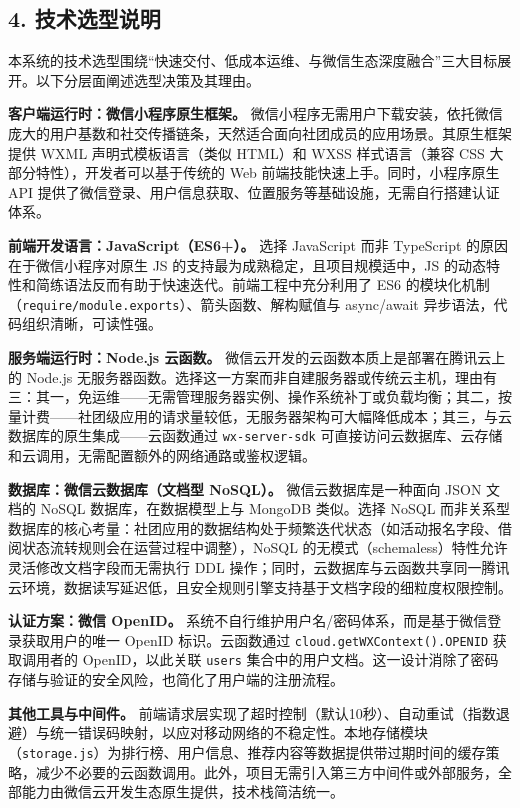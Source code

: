 \documentclass[a4paper,12pt]{article}
\begin{document}
\subsection{4. 技术选型说明}

本系统的技术选型围绕“快速交付、低成本运维、与微信生态深度融合”三大目标展开。以下分层面阐述选型决策及其理由。

\textbf{客户端运行时：微信小程序原生框架。} 微信小程序无需用户下载安装，依托微信庞大的用户基数和社交传播链条，天然适合面向社团成员的应用场景。其原生框架提供 WXML 声明式模板语言（类似 HTML）和 WXSS 样式语言（兼容 CSS 大部分特性），开发者可以基于传统的 Web 前端技能快速上手。同时，小程序原生 API 提供了微信登录、用户信息获取、位置服务等基础设施，无需自行搭建认证体系。

\textbf{前端开发语言：JavaScript（ES6+）。} 选择 JavaScript 而非 TypeScript 的原因在于微信小程序对原生 JS 的支持最为成熟稳定，且项目规模适中，JS 的动态特性和简练语法反而有助于快速迭代。前端工程中充分利用了 ES6 的模块化机制（\texttt{require/module.exports}）、箭头函数、解构赋值与 async/await 异步语法，代码组织清晰，可读性强。

\textbf{服务端运行时：Node.js 云函数。} 微信云开发的云函数本质上是部署在腾讯云上的 Node.js 无服务器函数。选择这一方案而非自建服务器或传统云主机，理由有三：其一，免运维——无需管理服务器实例、操作系统补丁或负载均衡；其二，按量计费——社团级应用的请求量较低，无服务器架构可大幅降低成本；其三，与云数据库的原生集成——云函数通过 \texttt{wx-server-sdk} 可直接访问云数据库、云存储和云调用，无需配置额外的网络通路或鉴权逻辑。

\textbf{数据库：微信云数据库（文档型 NoSQL）。} 微信云数据库是一种面向 JSON 文档的 NoSQL 数据库，在数据模型上与 MongoDB 类似。选择 NoSQL 而非关系型数据库的核心考量：社团应用的数据结构处于频繁迭代状态（如活动报名字段、借阅状态流转规则会在运营过程中调整），NoSQL 的无模式（schemaless）特性允许灵活修改文档字段而无需执行 DDL 操作；同时，云数据库与云函数共享同一腾讯云环境，数据读写延迟低，且安全规则引擎支持基于文档字段的细粒度权限控制。

\textbf{认证方案：微信 OpenID。} 系统不自行维护用户名/密码体系，而是基于微信登录获取用户的唯一 OpenID 标识。云函数通过 \texttt{cloud.\allowbreak getWXContext().\allowbreak OPENID} 获取调用者的 OpenID，以此关联 \texttt{users} 集合中的用户文档。这一设计消除了密码存储与验证的安全风险，也简化了用户端的注册流程。

\textbf{其他工具与中间件。} 前端请求层实现了超时控制（默认10秒）、自动重试（指数退避）与统一错误码映射，以应对移动网络的不稳定性。本地存储模块（\texttt{storage.js}）为排行榜、用户信息、推荐内容等数据提供带过期时间的缓存策略，减少不必要的云函数调用。此外，项目无需引入第三方中间件或外部服务，全部能力由微信云开发生态原生提供，技术栈简洁统一。
\end{document}
